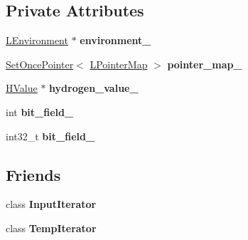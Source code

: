 \subsection*{Private Attributes}
\begin{DoxyCompactItemize}
\item 
\hyperlink{classv8_1_1internal_1_1_l_environment}{L\+Environment} $\ast$ {\bfseries environment\+\_\+}\hypertarget{classv8_1_1internal_1_1_l_instruction_ab382f9d43b3de63a7b87124d9fa12fa3}{}\label{classv8_1_1internal_1_1_l_instruction_ab382f9d43b3de63a7b87124d9fa12fa3}

\item 
\hyperlink{classv8_1_1internal_1_1_set_once_pointer}{Set\+Once\+Pointer}$<$ \hyperlink{classv8_1_1internal_1_1_l_pointer_map}{L\+Pointer\+Map} $>$ {\bfseries pointer\+\_\+map\+\_\+}\hypertarget{classv8_1_1internal_1_1_l_instruction_a0e1fb1700e4ed842dff9509f7fb2cbe6}{}\label{classv8_1_1internal_1_1_l_instruction_a0e1fb1700e4ed842dff9509f7fb2cbe6}

\item 
\hyperlink{classv8_1_1internal_1_1_h_value}{H\+Value} $\ast$ {\bfseries hydrogen\+\_\+value\+\_\+}\hypertarget{classv8_1_1internal_1_1_l_instruction_a7c9656064a9a5b2f5a57ad8fa9ecc316}{}\label{classv8_1_1internal_1_1_l_instruction_a7c9656064a9a5b2f5a57ad8fa9ecc316}

\item 
int {\bfseries bit\+\_\+field\+\_\+}\hypertarget{classv8_1_1internal_1_1_l_instruction_a08c8614684f7590d1fe12e15f36c1a8b}{}\label{classv8_1_1internal_1_1_l_instruction_a08c8614684f7590d1fe12e15f36c1a8b}

\item 
int32\+\_\+t {\bfseries bit\+\_\+field\+\_\+}\hypertarget{classv8_1_1internal_1_1_l_instruction_ac808063948e45443cfada1b942a09a6b}{}\label{classv8_1_1internal_1_1_l_instruction_ac808063948e45443cfada1b942a09a6b}

\end{DoxyCompactItemize}
\subsection*{Friends}
\begin{DoxyCompactItemize}
\item 
class {\bfseries Input\+Iterator}\hypertarget{classv8_1_1internal_1_1_l_instruction_ab26b092fbb4f5a999e0c6e89e90e1669}{}\label{classv8_1_1internal_1_1_l_instruction_ab26b092fbb4f5a999e0c6e89e90e1669}

\item 
class {\bfseries Temp\+Iterator}\hypertarget{classv8_1_1internal_1_1_l_instruction_a2f4a52bf8844dd80713c1e822654f93f}{}\label{classv8_1_1internal_1_1_l_instruction_a2f4a52bf8844dd80713c1e822654f93f}

\end{DoxyCompactItemize}


